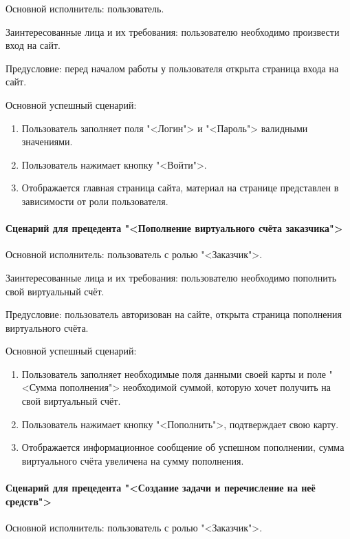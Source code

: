 Основной исполнитель: пользователь.

Заинтересованные лица и их требования: пользователю необходимо произвести вход на сайт.

Предусловие: перед началом работы у пользователя открыта страница входа на сайт.

Основной успешный сценарий:

\begin{enumerate}
	\item Пользователь заполняет поля "<Логин"> и "<Пароль"> валидными значениями. 
	\item Пользователь нажимает кнопку "<Войти">. 
	\item Отображается главная страница сайта, материал на странице представлен в зависимости от роли пользователя.
\end{enumerate} 

\paragraph{Сценарий для прецедента "<Пополнение виртуального счёта заказчика">}

Основной исполнитель: пользователь с ролью "<Заказчик">.

Заинтересованные лица и их требования: пользователю необходимо пополнить свой виртуальный счёт.

Предусловие: пользователь авторизован на сайте, открыта страница пополнения виртуального счёта.

Основной успешный сценарий: 

\begin{enumerate}
	\item Пользователь заполняет необходимые поля данными своей карты и поле "<Сумма пополнения"> необходимой суммой, которую хочет получить на свой виртуальный счёт. 
	\item Пользователь нажимает кнопку "<Пополнить">, подтверждает свою карту. \item Отображается информационное сообщение об успешном пополнении, сумма виртуального счёта увеличена на сумму пополнения.
\end{enumerate}
		
\paragraph{Сценарий для прецедента "<Создание задачи и перечисление на неё средств">}

Основной исполнитель: пользователь с ролью "<Заказчик">.

